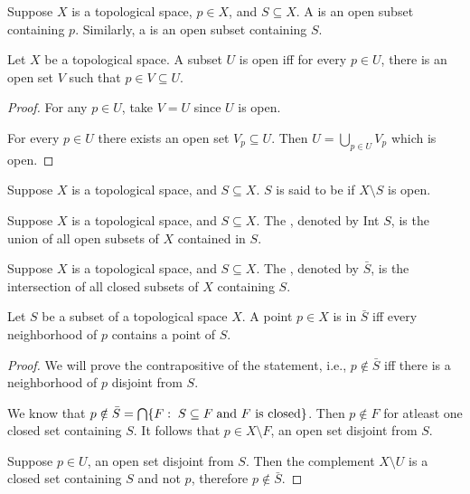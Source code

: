 \documentclass[11pt,a4paper]{article}
\begin{document}
\begin{definition}
Suppose $X$ is a topological space, $p\in X$, and $S\subseteq X$. A  is an open subset containing $p$. Similarly, a  is an open subset containing $S$. 
\end{definition}

\begin{proposition}\label{prop:local_criterion_for_openness}
Let $X$ be a topological space. A subset $U$ is open iff for every $p\in U$, there is an open set $V$ such that $p\in V\subseteq U$.
\end{proposition}

\begin{proof}
\forward For any $p\in U$, take $V = U$ since $U$ is open.

\noindent\converse For every $p\in U$ there exists an open set $V_p\subseteq U$. Then $U = \bigcup_{p\in U} V_p$ which is open.
\end{proof}

\begin{definition}
Suppose $X$ is a topological space, and $S\subseteq X$. $S$ is said to be  if $X\setminus S$ is open.
\end{definition}

\begin{definition}
Suppose $X$ is a topological space, and $S\subseteq X$. The , denoted by Int $S$, is the union of all open subsets of $X$ contained in $S$.
\end{definition}

\begin{definition}
Suppose $X$ is a topological space, and $S\subseteq X$. The , denoted by $\bar{S}$, is the intersection of all closed subsets of $X$ containing $S$.
\end{definition}

\begin{proposition}\label{prop:local_characterization_of_closure}
Let $S$ be a subset of a topological space $X$. A point $p\in X$ is in $\bar{S}$ iff every neighborhood of $p$ contains a point of $S$.
\end{proposition}

\begin{proof}
We will prove the contrapositive of the statement, i.e., $p\notin \bar{S}$ iff there is a neighborhood of $p$ disjoint from $S$.

\noindent\forward We know that $p\notin \bar{S} = \bigcap\{F:\; S\subseteq F\;\text{and ${F}$ is closed}\}$. Then $p\notin F$ for atleast one closed set containing $S$. It follows that $p\in X\setminus F$, an open set disjoint from $S$.

\noindent\converse Suppose $p\in U$, an open set disjoint from $S$. Then the complement $X\setminus U$ is a closed set containing $S$ and not $p$, therefore $p\notin \bar{S}$.
\end{proof}
\end{document}
